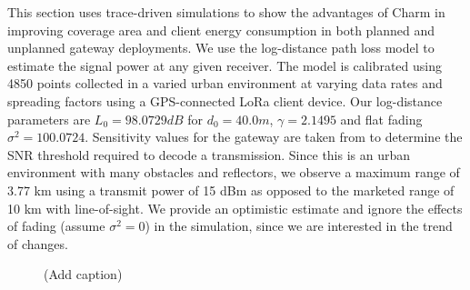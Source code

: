 This section uses trace-driven simulations to show the advantages of Charm in improving coverage area and client energy consumption in both planned and unplanned gateway deployments. We use the log-distance path loss model to estimate the signal power at any given receiver. The model is calibrated using 4850 points collected in a varied urban environment at varying data rates and spreading factors using a GPS-connected LoRa client device. Our log-distance parameters are $L_0  = 98.0729 dB$ for $d_0 = 40.0 m$, $\gamma = 2.1495$ and flat fading $\sigma^2 = 100.0724$. Sensitivity values for the gateway are taken from \cite{Bor2016} to determine the SNR threshold required to decode a transmission. Since this is an urban environment with many obstacles and reflectors, we observe a maximum range of 3.77 km using a transmit power of 15 dBm as opposed to the marketed range of 10 km with line-of-sight. We provide an optimistic estimate and ignore the effects of fading (assume $\sigma^2 = 0$) in the simulation, since we are interested in the trend of changes.

\begin{figure}[!htb]
\centering
{} \hfill
{} \hfill
{}
\compactimg
\caption{{\color{blue} (Add caption)}}
\label{fig:charm-improvement}
\compactimg
\end{figure}

